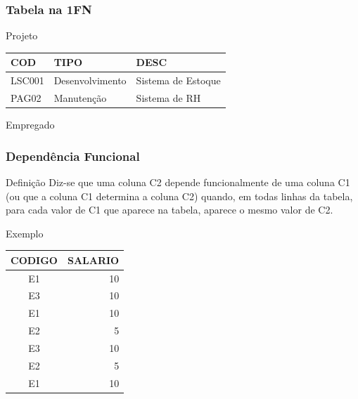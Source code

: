 \documentclass{beamer}
\begin{document}
\begin{frame}
\frametitle{Tabela na 1FN}

\begin{exampleblock}{Projeto}
\centering
\begin{tabular}{| l | l | l |}
\hline
COD & TIPO & DESC \\\hline
LSC001 & Desenvolvimento & Sistema de Estoque \\\hline
PAG02 & Manutenção & Sistema de RH \\\hline
\end{tabular}
\end{exampleblock}	\vfill

\begin{exampleblock}{Empregado}
\end{exampleblock}	
\end{frame}

\begin{frame}
\frametitle{Dependência Funcional}

\begin{block}{Definição}
	Diz-se que uma coluna C2 depende funcionalmente de uma coluna C1 (ou
	que a coluna C1 determina a coluna C2) quando, em todas linhas da tabela,
	para cada valor de C1 que aparece na tabela, aparece o mesmo valor de C2.
\end{block}\vfill

\begin{exampleblock}{Exemplo}
\centering
\begin{tabular}{| c | r |}
	\hline
	CODIGO & SALARIO  \\\hline
 E1 & 10 \\\hline
 E3 & 10\\\hline
 E1 & 10 \\\hline
 E2 & 5 \\\hline
 E3 & 10\\\hline
 E2 & 5 \\\hline
 E1 & 10\\\hline
\end{tabular}
\end{exampleblock}
\end{frame}
\end{document}

